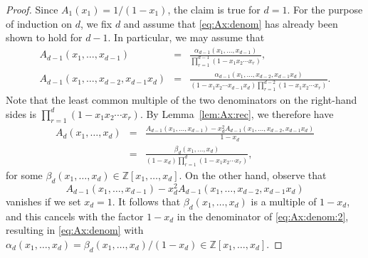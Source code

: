 \documentclass[11pt]{article}
\theoremstyle{plain}
\theoremstyle{definition}
\begin{document}
\begin{proof}
  Since $A_1 (x_1) = 1 / (1 - x_1)$, the claim is true for $d = 1$. For the
  purpose of induction on $d$, we fix $d$ and assume that \eqref{eq:Ax:denom}
  has already been shown to hold for $d - 1$. In particular, we may assume
  that
  \begin{eqnarray*}
    A_{d - 1} (x_1, \ldots, x_{d - 1}) & = & \frac{\alpha_{d - 1} (x_1,
    \ldots, x_{d - 1})}{\prod_{r = 1}^{d - 1} (1 - x_1 x_2 \cdots x_r) },\\
    A_{d - 1} (x_1, \ldots, x_{d - 2}, x_{d - 1} x_d) & = & \frac{\alpha_{d -
    1} (x_1, \ldots, x_{d - 2}, x_{d - 1} x_d)}{(1 - x_1 x_2 \cdots x_{d - 1}
    x_d) \prod_{r = 1}^{d - 2} (1 - x_1 x_2 \cdots x_r) } .
  \end{eqnarray*}
  Note that the least common multiple of the two denominators on the
  right-hand sides is $\prod_{r = 1}^d (1 - x_1 x_2 \cdots x_r)$. By
  Lemma~\ref{lem:Ax:rec}, we therefore have
  \begin{eqnarray}
    A_d (x_1, \ldots, x_d) & = & \frac{A_{d - 1} (x_1, \ldots, x_{d - 1}) -
    x_d^2 A_{d - 1} (x_1, \ldots, x_{d - 2}, x_{d - 1} x_d)}{1 - x_d}
    \nonumber\\
    & = & \frac{\beta_d (x_1, \ldots, x_d)}{(1 - x_d) \prod_{r = 1}^d (1 -
    x_1 x_2 \cdots x_r) },  \label{eq:Ax:denom:2}
  \end{eqnarray}
  for some $\beta_d (x_1, \ldots, x_d) \in \mathbb{Z} [x_1, \ldots, x_d]$. On
  the other hand, observe that
  \begin{equation*}
    A_{d - 1} (x_1, \ldots, x_{d - 1}) - x_d^2 A_{d - 1} (x_1, \ldots, x_{d -
     2}, x_{d - 1} x_d)
  \end{equation*}
  vanishes if we set $x_d = 1$. It follows that $\beta_d (x_1, \ldots, x_d)$
  is a multiple of $1 - x_d$, and this cancels with the factor $1 - x_d$ in
  the denominator of \eqref{eq:Ax:denom:2}, resulting in \eqref{eq:Ax:denom}
  with $\alpha_d (x_1, \ldots, x_d) = \beta_d (x_1, \ldots, x_d) / (1 - x_d)
  \in \mathbb{Z} [x_1, \ldots, x_d]$.
  

\end{proof}
\end{document}
